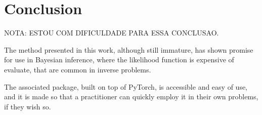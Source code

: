 \chapter{Conclusion}

NOTA: ESTOU COM DIFICULDADE PARA ESSA CONCLUSAO.

The method presented in this work, although still immature, has shown promise for use in Bayesian inference, where the likelihood function is expensive of evaluate, that are common in inverse problems.

The associated package, built on top of PyTorch, is accessible and easy of use, and it is made so that a practitioner can quickly employ it in their own problems, if they wish so. 